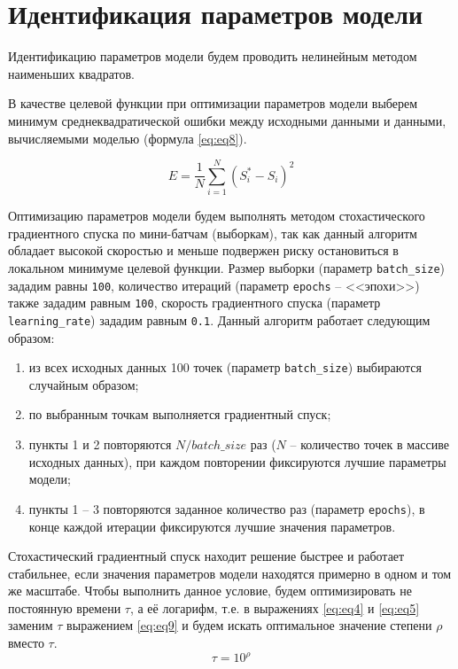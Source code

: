 \documentclass{report}
\begin{document}
        \section{Идентификация параметров модели}
        Идентификацию параметров модели будем проводить нелинейным методом 
        наименьших квадратов.
        
        В качестве целевой функции при оптимизации параметров модели выберем 
        минимум среднеквадратической ошибки между исходными данными и данными, 
        вычисляемыми моделью (формула \ref{eq:eq8}).

        \begin{equation}
            \label{eq:eq8}
            E = \frac{1}{N}\sum_{i=1}^{N}\left(S_i^*-S_i\right)^2
        \end{equation}

        Оптимизацию параметров модели будем выполнять методом стохастического 
        градиентного спуска по мини-батчам (выборкам), так как данный алгоритм 
        обладает высокой скоростью и меньше подвержен риску остановиться 
        в локальном минимуме целевой функции. Размер выборки (параметр 
        \texttt{batch\_size}) зададим равны \texttt{100}, количество итераций 
        (параметр \texttt{epochs} -- <<эпохи>>) также зададим равным \texttt{100}, 
        скорость градиентного спуска (параметр \texttt{learning\_rate}) зададим 
        равным \texttt{0.1}. Данный алгоритм работает следующим образом:
        \begin{enumerate}
            \item из всех исходных данных 100 точек (параметр 
            \texttt{batch\_size}) выбираются случайным образом;
            \item по выбранным точкам выполняется градиентный спуск;
            \item пункты 1 и 2 повторяются \(N/batch\_size\) раз 
            (\(N\) -- количество точек в массиве исходных данных), при 
            каждом повторении фиксируются лучшие параметры модели;
            \item пункты 1 -- 3 повторяются заданное количество раз 
            (параметр \texttt{epochs}), в конце каждой итерации фиксируются 
            лучшие значения параметров.
        \end{enumerate}

        Стохастический градиентный спуск находит решение быстрее и работает стабильнее, 
        если значения параметров модели находятся примерно в одном и том же масштабе. 
        Чтобы выполнить данное условие, будем оптимизировать не постоянную времени 
        $\tau$, а её логарифм, т.е. в выражениях \ref{eq:eq4} и \ref{eq:eq5} заменим 
        $\tau$ выражением \ref{eq:eq9} и будем искать оптимальное значение степени 
        $\rho$ вместо $\tau$.
        \begin{equation}
            \label{eq:eq9}
            \tau = 10^\rho
        \end{equation}
\end{document}
